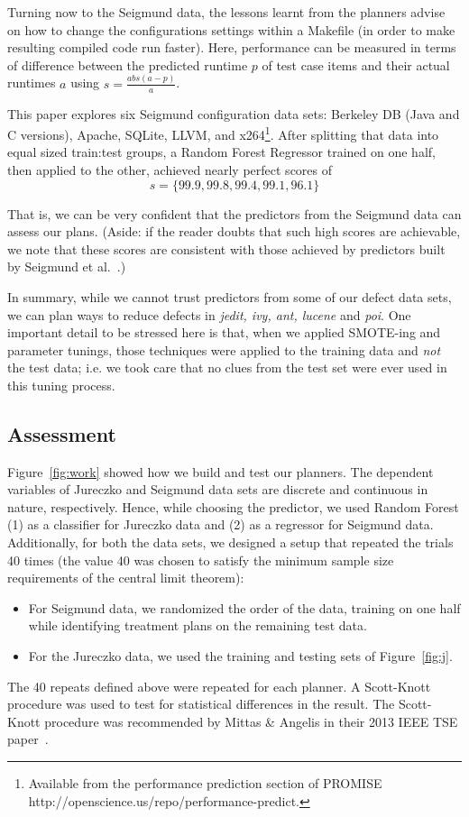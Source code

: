 \documentclass{sig-alternate}
\newcommand{\bi}{\begin{itemize}[leftmargin=0.4cm]}
\newcommand{\ei}{\end{itemize}}
\newcommand{\fig}[1]{Figure~\ref{fig:#1}}
\begin{document}
Turning now to the Seigmund data, the lessons learnt from the planners advise on how  to change the configurations settings within a Makefile (in order to make resulting compiled code  run faster). Here, performance can be measured in terms of  difference between the predicted runtime $p$ of test case items and their actual runtimes $a$ using  $s=\frac{abs(a - p)}{a}$.

This paper  explores six Seigmund configuration data sets:  Berkeley DB (Java and C versions), Apache, SQLite, LLVM, and
  x264\footnote{Available from the performance prediction section of PROMISE
  http://openscience.us/repo/performance-predict.}. 
  After splitting that data into equal sized train:test groups, a Random Forest
  Regressor trained on one half, then applied to the other, achieved nearly perfect scores of \[s=\{99.9, 99.8, 99.4, 99.1, 96.1\}\] 
  
That is, we can be very confident that the predictors from the Seigmund data can assess
our plans. (Aside: if the reader doubts that such high scores are achievable, we note that these scores are consistent with those achieved by predictors built by Seigmund et al.~\cite{sven12}.)

In summary, while we cannot trust predictors from some of our defect data sets,
we can plan ways to reduce defects in {\em jedit, ivy, ant, lucene} and {\em poi}.
One important detail to be stressed here is that, when we applied    SMOTE-ing and
parameter tunings, those techniques were applied to the training data and {\em not}
the test data; i.e. we took care that no clues from the test set were ever used in this tuning process.

\subsection{Assessment}
\fig{work} showed how we build and test our planners. The dependent variables of Jureczko and Seigmund data sets are discrete and continuous in nature, respectively. Hence, while choosing the predictor, we used Random Forest (1) as a classifier for Jureczko data and (2) as a regressor for Seigmund data. Additionally, for both the data sets, we designed a setup that repeated the trials 40 times (the value 40 was chosen to satisfy the minimum sample size requirements of the central limit theorem):
\bi
\item For Seigmund data, we randomized the order of the data, training on one half while identifying treatment plans on the remaining test data.
\item For the Jureczko data, we used the training and testing sets of \fig{j}. 
\ei
The 40 repeats defined above were repeated for each planner. A Scott-Knott procedure was used to test for statistical differences in the result. The Scott-Knott procedure was recommended by Mittas \& Angelis in their 2013 IEEE TSE paper~\cite{mittas13}.
\end{document}
